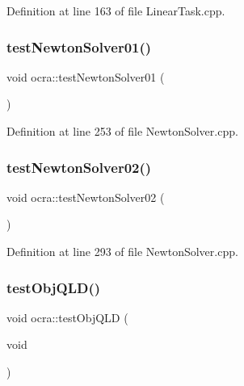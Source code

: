 Definition at line 163 of file Linear\+Task.\+cpp.

\hypertarget{namespaceocra_ae64acc62734a50a2f069755cca40191e}{}\label{namespaceocra_ae64acc62734a50a2f069755cca40191e} 
\subsubsection{\texorpdfstring{test\+Newton\+Solver01()}{testNewtonSolver01()}}
{\footnotesize\ttfamily void ocra\+::test\+Newton\+Solver01 (\begin{DoxyParamCaption}{ }\end{DoxyParamCaption})}



Definition at line 253 of file Newton\+Solver.\+cpp.

\hypertarget{namespaceocra_af7d2b78a380fe5aafe2b9a702e5a5347}{}\label{namespaceocra_af7d2b78a380fe5aafe2b9a702e5a5347} 
\subsubsection{\texorpdfstring{test\+Newton\+Solver02()}{testNewtonSolver02()}}
{\footnotesize\ttfamily void ocra\+::test\+Newton\+Solver02 (\begin{DoxyParamCaption}{ }\end{DoxyParamCaption})}



Definition at line 293 of file Newton\+Solver.\+cpp.

\hypertarget{namespaceocra_a053cec45f4d336dc6425e24a2d8d4032}{}\label{namespaceocra_a053cec45f4d336dc6425e24a2d8d4032} 
\subsubsection{\texorpdfstring{test\+Obj\+Q\+L\+D()}{testObjQLD()}}
{\footnotesize\ttfamily void ocra\+::test\+Obj\+Q\+LD (\begin{DoxyParamCaption}\item[{void}]{ }\end{DoxyParamCaption})}

\hypertarget{namespaceocra_ad44e7cce61ab6f95b66b751e6b223c9b}{}\label{namespaceocra_ad44e7cce61ab6f95b66b751e6b223c9b} 
